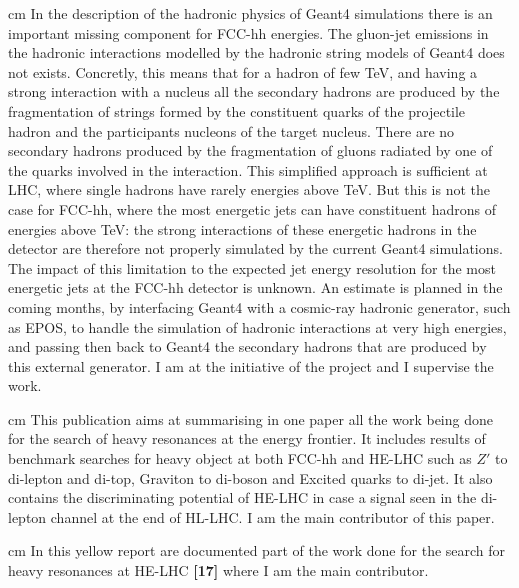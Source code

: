\documentclass[12pt]{article}
\begin{document}
 cm
\noindent {\bf \color{red} [16]} In the description of the hadronic physics of Geant4 simulations there is an important missing component for FCC-hh energies. The gluon-jet emissions in the hadronic interactions modelled by the hadronic string models of Geant4 does not exists. Concretly, this means that for a hadron of few TeV, and having a strong interaction with a nucleus all the secondary hadrons are produced by the fragmentation of strings formed by the constituent quarks of the projectile hadron and the participants nucleons of the target nucleus. There are no secondary hadrons produced by the fragmentation of gluons radiated by one of the quarks involved in the interaction. This simplified approach is sufficient at LHC, where single hadrons have rarely energies above TeV. But this is not the case for FCC-hh, where the most energetic jets can have constituent hadrons of energies above TeV: the strong interactions of these energetic hadrons in the detector are therefore not properly simulated by the current Geant4 simulations. The impact of this limitation to the expected jet energy resolution for the most energetic jets at the FCC-hh detector is unknown. An estimate is planned in the coming months, by interfacing Geant4 with a cosmic-ray hadronic generator, such as EPOS, to handle the simulation of hadronic interactions at very high energies, and passing then back to Geant4 the secondary hadrons that are produced by this external generator. I am at the initiative of the project and I supervise the work.


 cm
\noindent {\bf \color{red} [17]} This publication aims at summarising in one paper all the work being done for the search of heavy resonances at the energy frontier. It includes results of benchmark searches for heavy object at both FCC-hh and HE-LHC such as $Z'$ to di-lepton and di-top, Graviton to di-boson and Excited quarks to di-jet. It also contains the discriminating potential of HE-LHC in case a signal seen in the di-lepton channel at the end of HL-LHC. I am the main contributor of this paper.

 cm
\noindent {\bf \color{red} [18]} In this yellow report are documented part of the work done for the search for heavy resonances at HE-LHC {\bf \color{red} [17]} where I am the main contributor.
\end{document}
